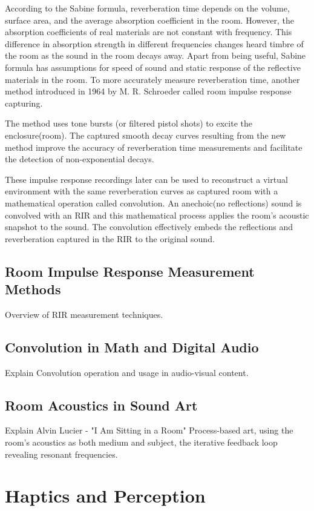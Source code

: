             According to the Sabine formula, reverberation time depends on the volume, surface area, and the average absorption coefficient in the room. However, the absorption coefficients of real materials are not constant with frequency. This difference in absorption strength in different frequencies changes heard timbre of the room as the sound in the room decays away. Apart from being useful, Sabine formula has assumptions for speed of sound and static response of the reflective materials in the room. To more accurately measure reverberation time, another method introduced in 1964 by M. R. Schroeder called room impulse response capturing\cite{Blank}.\par

            The method uses tone bursts (or filtered pistol shots) to excite the enclosure(room). The captured smooth decay curves resulting from the new method improve the accuracy of reverberation time measurements and facilitate the detection of non-exponential decays\cite{Blank}.\par

            These impulse response recordings later can be used to reconstruct a virtual environment with the same reverberation curves as captured room with a mathematical operation called convolution. An anechoic(no reflections) sound is convolved with an RIR and this mathematical process applies the room's acoustic snapshot to the sound. The convolution effectively embeds the reflections and reverberation captured in the RIR to the original sound.
        \subsection{Room Impulse Response Measurement Methods} Overview of RIR measurement techniques.
        \subsection{Convolution in Math and Digital Audio} Explain Convolution operation and usage in audio-visual content.
        \subsection{Room Acoustics in Sound Art} Explain Alvin Lucier - "I Am Sitting in a Room" Process-based art, using the room's acoustics as both medium and subject, the iterative feedback loop revealing resonant frequencies.
    \section{Haptics and Perception}
